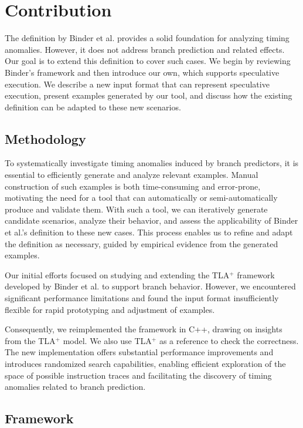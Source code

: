 \chapter{Contribution}
The definition by Binder et al. \cite{binder_definitions_2022} provides a solid foundation for analyzing timing anomalies. However, it does not address branch prediction and related effects. Our goal is to extend this definition to cover such cases. We begin by reviewing Binder's framework and then introduce our own, which supports speculative execution. We describe a new input format that can represent speculative execution, present examples generated by our tool, and discuss how the existing definition can be adapted to these new scenarios.

\section{Methodology}
To systematically investigate timing anomalies induced by branch predictors, it is essential to efficiently generate and analyze relevant examples. Manual construction of such examples is both time-consuming and error-prone, motivating the need for a tool that can automatically or semi-automatically produce and validate them. With such a tool, we can iteratively generate candidate scenarios, analyze their behavior, and assess the applicability of Binder et al.'s definition to these new cases. This process enables us to refine and adapt the definition as necessary, guided by empirical evidence from the generated examples.

Our initial efforts focused on studying and extending the TLA$^+$ \cite{lamport_specifying_2003} framework developed by Binder et al.  to support branch behavior. However, we encountered significant performance limitations and found the input format insufficiently flexible for rapid prototyping and adjustment of examples.

Consequently, we reimplemented the framework in C++, drawing on insights from the TLA$^+$ model. We also use TLA$^+$ as a reference to check the correctness. The new implementation offers substantial performance improvements and introduces randomized search capabilities, enabling efficient exploration of the space of possible instruction traces and facilitating the discovery of timing anomalies related to branch prediction.

\section{Framework}

